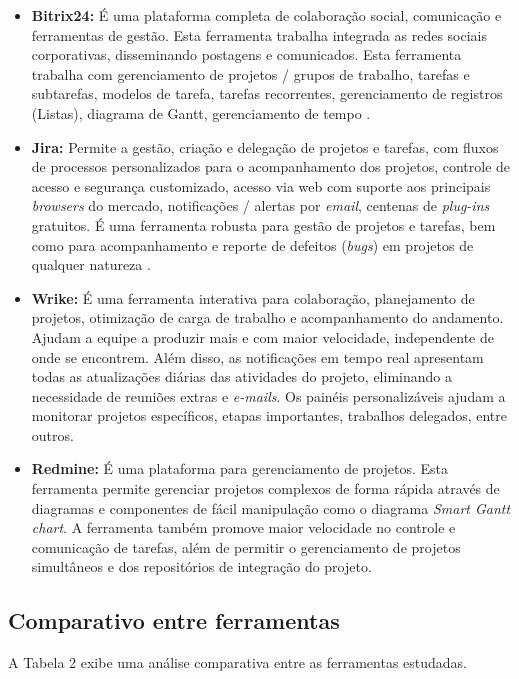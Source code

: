 \documentclass{acm_proc_article-sp}
\begin{document}
\begin{itemize}
\item \textbf{Bitrix24:} É uma plataforma completa de colaboração social, comunicação e ferramentas de gestão. Esta ferramenta trabalha integrada as redes sociais corporativas, disseminando postagens e comunicados. Esta ferramenta trabalha com gerenciamento de projetos / grupos de trabalho, tarefas e subtarefas, modelos de tarefa, tarefas recorrentes, gerenciamento de registros (Listas), diagrama de Gantt, gerenciamento de tempo \cite{bitrix24:ferramenta}.
\item \textbf{Jira:}  Permite a gestão, criação e delegação de projetos e tarefas, com fluxos de processos personalizados para o acompanhamento dos projetos, controle de acesso e segurança customizado, acesso via web com suporte aos principais \textit{browsers} do mercado, notificações / alertas por \textit{email},  centenas de \textit{plug-ins} gratuitos. É uma ferramenta robusta para gestão de projetos e tarefas, bem como para acompanhamento e reporte de defeitos (\textit{bugs}) em projetos de qualquer natureza \cite{jira:ferramenta}.
\item \textbf{Wrike:} É uma ferramenta interativa para colaboração, planejamento de projetos, otimização de carga de trabalho e acompanhamento do andamento. Ajudam a equipe a produzir mais e com maior velocidade, independente de onde se encontrem. Além disso, as notificações em tempo real apresentam todas as atualizações diárias das atividades do projeto, eliminando a necessidade de reuniões extras e \textit{e-mails}. Os painéis personalizáveis ajudam a monitorar projetos específicos, etapas importantes, trabalhos delegados, entre outros.  
\item \textbf{Redmine:} É uma plataforma para gerenciamento de projetos. Esta ferramenta permite gerenciar projetos complexos de forma rápida através de diagramas e componentes de fácil manipulação como o diagrama \textit{Smart Gantt chart}. A ferramenta também promove maior velocidade no controle e comunicação de tarefas, além de permitir o gerenciamento de projetos simultâneos e dos repositórios de integração do projeto.
\end{itemize}

\subsection{Comparativo entre ferramentas}
 A Tabela 2 exibe uma análise comparativa entre as ferramentas estudadas.
\end{document}
